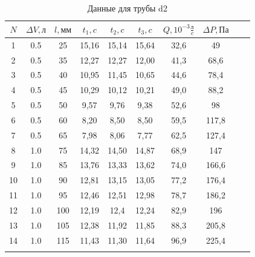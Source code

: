 \documentclass[a4paper, 12pt]{article}%
\begin{document}
\begin{enumerate}
		\begin{longtable}{|c|c|c|c|c|c|c|c|c|c|} \hline
		$N$ &  $\Delta V,  \text{л}$  &   $l, \text{мм}$ &     $t_1, c$ &     $t_2, c$ &     $t_3, c$ &    $ Q, 10^{-3} \frac{\text{л}}{c} $ & $\Delta P, \text{Па}$\\ \hline
		1& 0.5   &  25 &  15,16 &  15,14 &  15,64 &    32,6 &   49\\ \hline
		2&   0.5 &  35 &  12,27 &  12,27 &  12,00 &    41,3 &   68,6\\ \hline
		3 &   0.5 &  40 &  10,95 &  11,45 &  10,65 &    44,6 &   78,4 \\ \hline
		4 &   0.5 &  45 &  10,29 &  10,12 &  10,21 &    49,0 &   88,2 \\ \hline
		5 &  0.5 &  50 &  9,57 &  9,76 &  9,38 &    52,6 &   98 \\ \hline
		6 &   0.5 &  60 &  8,20 &  8,50 &  8,50 &   59,5 &   117,8 \\ \hline
		7 &   0.5 &  65 &  7,98 &  8,06 &  7,77 &   62,5 &   127,4 \\\hline
		8 &   1.0 &  75 &  14,32 &  14,50 &  14,87 &    68,9 &   147 \\ \hline
		9 &   1.0 &  85 &  13,76 &  13,33 &  13,62 &    74,0 &  166,6 \\ \hline
		10 &  1.0 &  90 &  12,81 &  13,15 &  13,05 &    77,2 &  176,4 \\ \hline
		11 &  1.0 &  95 &  12,46 & 12,51 &  12,98 &    78,7 &  186,2 \\ \hline
		12 &  1.0 &  100 &  12,19 &  12,4 &  12,24 &   82,9 &  196 \\ \hline
		13 &  1.0 &  105 &  12,38 &  11,92 &  11,85 &    88,3 &  205,8 \\ \hline
		14&  1.0  &  115 &  11,43 &  11,30 &  11,64 &   96,9 &  225,4 \\ \hline
		\caption{ Данные для трубы d2}
	\end{longtable}
	
	
	\begin{figure}[H]
		\caption{}
	\end{figure}



\end{enumerate}
\end{document}
